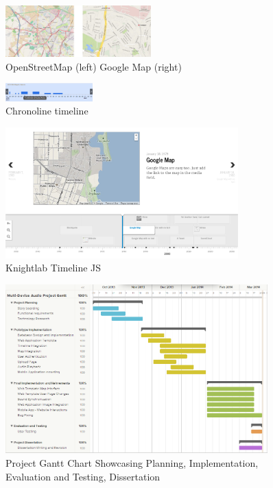 \documentclass{l3proj}
\begin{document}
\newpage
\begin{figure}[ht!]
\centering
\includegraphics[angle=270, width=0.5\textwidth]{images/openstreetmap_google-map.jpg}
\caption{OpenStreetMap (left) Google Map (right)}
\end{figure}

\newpage
\begin{figure}[ht!]
\centering
\includegraphics[angle=270, width=0.3\textwidth]{images/Chronoline.png}
\caption{Chronoline timeline}
\end{figure}

\newpage
\begin{figure}[ht!]
\centering
\includegraphics[angle=270, width=0.8\textwidth]{images/timeline-example.png}
\caption{Knightlab Timeline JS}
\end{figure}

\newpage
\begin{figure}[ht!]
\centering
\includegraphics[angle=270, width=0.9\textwidth]{images/gantt.png}
\caption{Project Gantt Chart Showcasing Planning, Implementation, Evaluation and Testing, Dissertation}
\end{figure}
\end{document}
